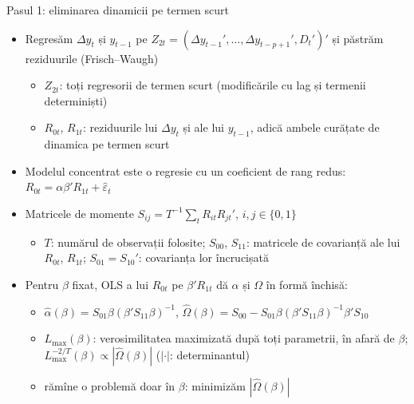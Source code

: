 \begin{frame}{Pasul 1: eliminarea dinamicii pe termen scurt}
\itemsize{\small}
\begin{itemize}
    \item Regresăm $\Delta y_t$ și $y_{t-1}$ pe $Z_{2t} = (\Delta y_{t-1}', \dots, \Delta y_{t-p+1}', D_t')'$ și păstrăm reziduurile (Frisch--Waugh)
    \begin{itemize}
        \item $Z_{2t}$: toți regresorii de termen scurt (modificările cu lag și termenii determiniști)
        \item $R_{0t}$, $R_{1t}$: reziduurile lui $\Delta y_t$ și ale lui $y_{t-1}$, adică ambele curățate de dinamica pe termen scurt
    \end{itemize}
    \item Modelul concentrat este o regresie cu un coeficient de rang redus: $R_{0t} = \alpha\beta'R_{1t} + \hat\varepsilon_t$
    \item Matricele de momente $S_{ij} = T^{-1}\sum_t R_{it}R_{jt}'$, $i, j \in \{0, 1\}$
    \begin{itemize}
        \item $T$: numărul de observații folosite; $S_{00}$, $S_{11}$: matricele de covarianță ale lui $R_{0t}$, $R_{1t}$; $S_{01} = S_{10}'$: covarianța lor încrucișată
    \end{itemize}
    \item Pentru $\beta$ fixat, OLS a lui $R_{0t}$ pe $\beta'R_{1t}$ dă $\alpha$ și $\Omega$ în formă închisă:
    \begin{itemize}
        \item $\hat\alpha(\beta) = S_{01}\beta(\beta'S_{11}\beta)^{-1}$, $\hat\Omega(\beta) = S_{00} - S_{01}\beta(\beta'S_{11}\beta)^{-1}\beta'S_{10}$
        \item $L_{\max}(\beta)$: verosimilitatea maximizată după toți parametrii, în afară de $\beta$; $L_{\max}^{-2/T}(\beta) \propto |\hat\Omega(\beta)|$ ($|\cdot|$: determinantul)
        \item rămîne o problemă doar în $\beta$: minimizăm $|\hat\Omega(\beta)|$
    \end{itemize}
\end{itemize}
\end{frame}

